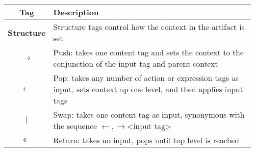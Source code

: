 \begin{table}[h!]
  \centering
  \begin{tabular}{c p{1.8\linewidth}}
    \textbf{Tag} & \textbf{Description} \\
    \hline
    \hline


    \textbf{Structure} &  Structure tags control how the context in the artifact is set \\
    \hline
    $\rightarrow$ & Push: takes one content tag and sets the context to the conjunction of the input tag and parent context \\
    $\leftarrow$ & Pop: takes any number of action or expression tags as input, sets context up one level, and then applies input tags\\
    $|$ & Swap: takes one content tag as input, synonymous with the sequence $\leftarrow, \rightarrow \text{<input tag>}$ \\
    $\twoheadleftarrow$ & Return: takes no input, pops until top level is reached \\


\end{tabular}
\end{table}
